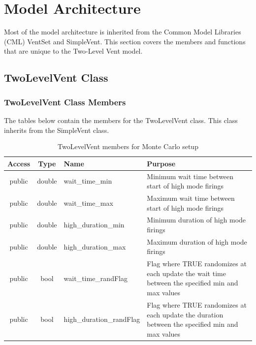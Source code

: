 \documentclass[11pt,fleqn]{report}
\begin{document}


\chapter{Model Architecture}
\noindent Most of the model architecture is inherited from the Common Model Libraries (CML) VentSet
and SimpleVent. This section covers the members and functions that are unique to the Two-Level Vent model.

\section{TwoLevelVent Class}
\subsection{TwoLevelVent Class Members}
\noindent The tables below contain the members for the TwoLevelVent class. This class inherits from the 
SimpleVent class.

\begin{table}[!h]
    \caption{TwoLevelVent members for Monte Carlo setup}
    \begin{tabularx}{\textwidth}{|c|c|X|X|} 
    \hline
    \textbf{Access} & \textbf{Type} & \textbf{Name} & \textbf{Purpose} \\
    \hline
    public & double & wait\_time\_min & Minimum wait time between start of high mode firings \\
    \hline
    public & double & wait\_time\_max & Maximum wait time between start of high mode firings \\
    \hline
    public & double & high\_duration\_min & Minimum duration of high mode firings \\
    \hline
    public & double & high\_duration\_max & Maximum duration of high mode firings \\
    \hline
    public & bool & wait\_time\_randFlag & Flag where TRUE randomizes at each update the wait time between
                                        the specified min and max values \\
    \hline
    public & bool & high\_duration\_randFlag & Flag where TRUE randomizes at each update the duration between
                                        the specified min and max values \\
    \hline
    \end{tabularx}
\end{table}
\end{document}
